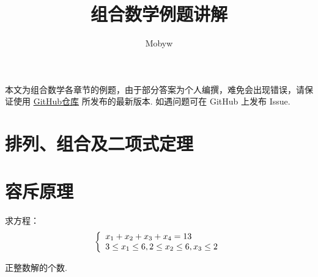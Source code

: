 \documentclass[cn, hazy, blue, normal, 12pt]{elegantnote}
\title{组合数学例题讲解}
\author{Mobyw}
\date{\zhtoday}
\begin{document}
\maketitle



本文为组合数学各章节的例题，由于部分答案为个人编撰，难免会出现错误，请保证使用 \href{https://github.com/mobyw/MasterCourseNotes/blob/master/CombinatorialMathematics/CombinatorialMathematicsExamples.pdf}{GitHub仓库} 所发布的最新版本. 如遇问题可在 GitHub 上发布 Issue.


\section{排列、组合及二项式定理}



\section{容斥原理}

\begin{exercise}

    求方程：
    \begin{equation}
        \notag
        \left\{\begin{array}{l}
            x_{1}+x_{2}+x_{3}+x_{4}=13 \\
            3 \leq x_{1} \leq 6, 2 \leq x_{2} \leq 6, x_{3} \leq 2
        \end{array}\right.
    \end{equation}

    正整数解的个数.

\end{exercise}
\end{document}
